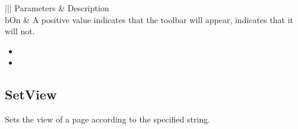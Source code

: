 \documentclass[letterpaper,12pt,english,openany,oneside]{sphinxmanual}
\begin{document}
\begin{savenotes}\sphinxattablestart
\centering
{}\label{\detokenize{IAC_API_OLE_Objects:section-105}}\nobreak
\begin{tabular}[t]{|||}
\hline
\sphinxstyletheadfamily 
Parameters
&\sphinxstyletheadfamily 
Description
\\
\hline
bOn
&
A positive value indicates that the toolbar will appear,  indicates that it will not.
\\
\hline
\end{tabular}
\par
\sphinxattableend\end{savenotes}
\label{\detokenize{IAC_API_OLE_Objects:related-methods-151}}
\begin{itemize}
\item {} 
 

\item {} 
 

\end{itemize}




\subsection{SetView}
\label{\detokenize{IAC_API_OLE_Objects:setview}}
Sets the view of a page according to the specified string.


\begin{sphinxVerbatim}[commandchars=\\\{\}]
  
\end{sphinxVerbatim}
\label{\detokenize{IAC_API_OLE_Objects:parameters-91}}
\end{document}
